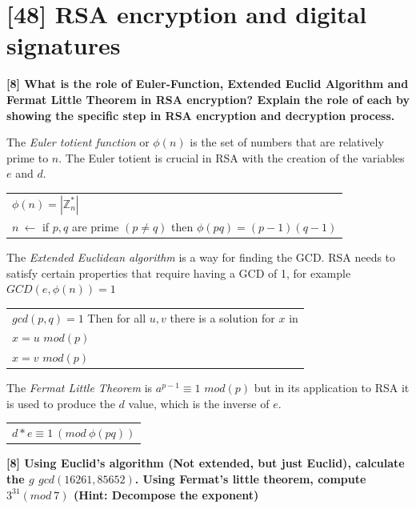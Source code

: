 \documentclass[letterpaper,11pt,notitlepage,fleqn]{article}
\begin{document}
\section{[48] RSA encryption and digital signatures}

\noindent \textbf{[8]  What  is  the  role  of  Euler-Function,  Extended  Euclid  Algorithm  and  Fermat Little  Theorem  in  RSA  encryption?  Explain  the  role  of  each  by  showing  the specific step in RSA encryption and decryption process.}

The \textit{Euler totient function} or $\phi(n)$ is the set of numbers that are relatively prime to $n$. The Euler totient is crucial in RSA with the creation of the variables $e$ and $d$.\\
\begin{center}
    \begin{tabular}{l}
        $\phi(n) = |\mathbb{Z}_{n}^{*}|$ \\
        $n\ \leftarrow$ if $p,q$ are prime $(p \neq q)$ then $\phi(pq) = (p-1)(q-1)$
    \end{tabular}
\end{center}

The \textit{Extended Euclidean algorithm} is a way for finding the GCD. RSA needs to satisfy certain properties that require having a GCD of 1, for example $GCD(e,\phi(n)) = 1$\\
\begin{center}
    \begin{tabular}{l}
        $gcd(p,q) = 1$ Then for all $u,v$ there is a solution for $x$ in \\
        $x = u$ $mod(p)$ \\ 
        $x = v$ $mod(p)$ 
    \end{tabular}
\end{center}

The \textit{Fermat Little Theorem} is $a^{p-1} \equiv 1$ $mod(p)$ but in its application to RSA it is used to produce the $d$ value, which is the inverse of $e$.\\
\begin{center}
    \begin{tabular}{l}
        $d \ast e \equiv 1\ (mod\ \phi(pq))$
    \end{tabular}
\end{center}

\noindent \textbf{[8] Using Euclid’s algorithm (Not extended, but just Euclid), calculate the $g$ $gcd(16261,  85652)$.  Using  Fermat’s  little  theorem,  compute  $3^{31}  (mod\ 7)$  (Hint: Decompose the exponent)} 
\end{document}
